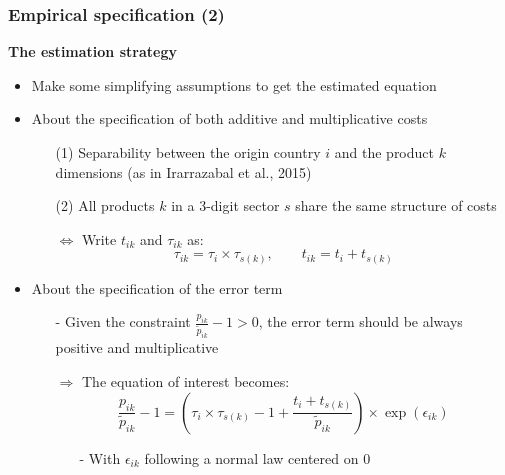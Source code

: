 \documentclass[10 pt,Helvetica, french]{beamer}
\begin{document}
\begin{frame}[label = est_strategy]
\frametitle{Empirical specification (2)}
\textbf{The estimation strategy} \vspace{0.1cm}
\begin{itemize}
\item Make some simplifying assumptions to get the estimated equation \vspace{0.1cm}
\item About the specification of both additive and multiplicative costs  \vspace{0.1cm}
\begin{itemize}
\item[(1)] Separability between the origin country $i$ and the product $k$ dimensions (as in Irarrazabal et al., 2015)\vspace{0.1cm}
\item[(2)] All products $k$ in a 3-digit sector $s$ share the same structure of costs \hyperlink{app_variancedecomp}{}\vspace{0.1cm}
\item[$\Leftrightarrow$] Write $t_{ik}$ and $\tau_{ik}$ as:
\footnotesize
\begin{equation}
 \tau_{ik} = \tau_{i} \times \tau_{s(k)}, \qquad t_{ik} = t_{i} + t_{s(k)} \label{eq:specifTC}
 \end{equation}
 \normalsize
\end{itemize}

\pause

\item About the specification of the error term \vspace{0.1cm}
\begin{itemize}
\item[-] Given the constraint $\frac{p_{ik}}{\widetilde{p}_{ik}} -1>0$, the error term should be always positive and multiplicative \vspace{0.1cm}
\item[$\Rightarrow$] The equation of interest becomes:
\footnotesize
$$\frac{p_{ik}}{\widetilde{p}_{ik}}-1 =\left(\tau_{i} \times \tau_{s(k)} -1+\frac{t_{i} + t_{s(k)}}{\widetilde{p}_{ik}} \right)\times \exp(\epsilon_{ik})$$
\normalsize
\begin{itemize}
\item[-] With $\epsilon_{ik}$ following a normal law centered on 0
\end{itemize}
\end{itemize}
\end{itemize}
\end{frame}
\end{document}
